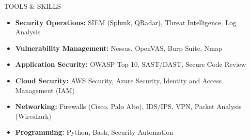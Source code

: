 \documentclass{resume} %
\begin{document}
\begin{rSection}{TOOLS \& SKILLS}
\begin{itemize}
    \item \textbf{Security Operations:} SIEM (Splunk, QRadar), Threat Intelligence, Log Analysis
    \item \textbf{Vulnerability Management:} Nessus, OpenVAS, Burp Suite, Nmap
    \item \textbf{Application Security:} OWASP Top 10, SAST/DAST, Secure Code Review
    \item \textbf{Cloud Security:} AWS Security, Azure Security, Identity and Access Management (IAM)
    \item \textbf{Networking:} Firewalls (Cisco, Palo Alto), IDS/IPS, VPN, Packet Analysis (Wireshark)
    \item \textbf{Programming:} Python, Bash, Security Automation
\end{itemize}
\end{rSection}
\end{document}
